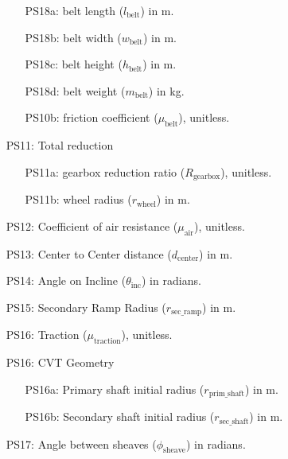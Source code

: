 \documentclass[12pt]{article}
\begin{document}
\begin{itemize}
\begin{itemize}
  \item [PS18a:] belt length ($l_{\text{belt}}$) in m.
  \item [PS18b:] belt width ($w_{\text{belt}}$) in m.
  \item [PS18c:] belt height ($h_{\text{belt}}$) in m.
  \item [PS18d:] belt weight ($m_{\text{belt}}$) in kg.
  \item [PS10b:] friction coefficient ($\mu_{\text{belt}}$), unitless.
\end{itemize}

\item[PS11:] Total reduction

\begin{itemize}
  \item [PS11a:] gearbox reduction ratio ($R_{\text{gearbox}}$), unitless.
  \item [PS11b:] wheel radius ($r_{\text{wheel}}$) in m.
\end{itemize}

\item[PS12:] Coefficient of air resistance ($\mu_{\text{air}}$), unitless.

\item[PS13:] Center to Center distance ($d_{\text{center}}$) in m.

\item[PS14:] Angle on Incline ($\theta_{\text{inc}}$) in radians.

\item[PS15:] Secondary Ramp Radius ($r_{\text{sec\_ramp}}$) in m.

\item[PS16:] Traction ($\mu_{\text{traction}}$), unitless.

\item[PS16:] CVT Geometry
\item[] \begin{itemize}
  \item [PS16a:] Primary shaft initial radius ($r_{\text{prim\_shaft}}$) in m.
  \item [PS16b:] Secondary shaft initial radius ($r_{\text{sec\_shaft}}$) in m.
\end{itemize}

\item[PS17:] Angle between sheaves ($\phi_{\text{sheave}}$) in radians. 

\end{itemize}
\end{document}
